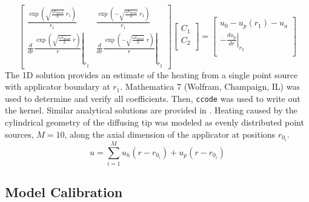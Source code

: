 \documentclass[12pt]{article}
\begin{document}
\[
\begin{bmatrix}
    \frac{\exp\left( \sqrt{\frac{\omega c_\textit{blood}}{k}} \; r_1 \right)}{r_1}  
  & 
    \frac{\exp\left(-\sqrt{\frac{\omega c_\textit{blood}}{k}} \; r_1 \right)}{r_1}  
  \\
  \left.
   \frac{d}{dr}
    \frac{\exp\left( \sqrt{\frac{\omega c_\textit{blood}}{k}} \; r \right)}{r}  
  \right|_{r_2}
  & 
  \left.
   \frac{d}{dr}
    \frac{\exp\left(-\sqrt{\frac{\omega c_\textit{blood}}{k}} \; r \right)}{r}  
  \right|_{r_2}
\end{bmatrix}
\begin{bmatrix}
  C_1 \\
  C_2 \\
\end{bmatrix}
= 
\begin{bmatrix}
      u_0 - u_p(r_1) - u_a    \\
  - \left. \frac{d u_p}{dr} 
  \right|_{r_2}\\
\end{bmatrix}
\]
The 1D solution provides an estimate of the heating from a single point source
with applicator boundary at $r_1$. Mathematica 7 (Wolfram, Champaign, IL) was used
to determine and verify all coefficients. Then, \verb#ccode# was used to write out the kernel.
Similar analytical solutions are provided in \cite{Giordano2010,Vyas1992,Deng2002}.
Heating caused by the cylindrical geometry of the diffusing tip was modeled as
evenly distributed point sources, $M = 10$, along the axial dimension of the
applicator at positions $r_{0_i}$. 
\begin{equation}\label{GreenSuperPosition}
  u = \sum_{i=1}^M u_h( r-r_{0_i}) + u_p( r-r_{0_i})
\end{equation}


\subsection{Model Calibration}\label{ModelCalibration}
\end{document}
